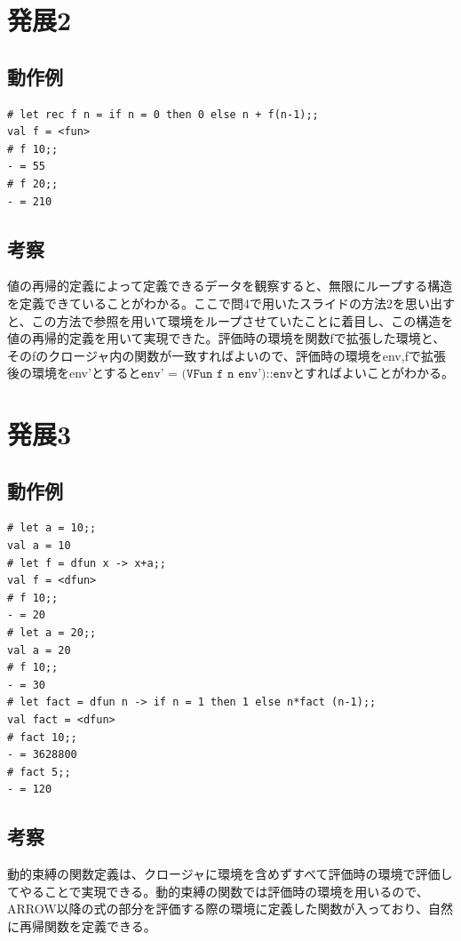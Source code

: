 \documentclass[11pt,a4paper]{jsarticle}
\begin{document}
\section*{発展2}
\subsection*{動作例}
\begin{lstlisting}[basicstyle=\ttfamily\footnotesize, frame=single]
# let rec f n = if n = 0 then 0 else n + f(n-1);;
val f = <fun>
# f 10;;
- = 55
# f 20;;
- = 210
\end{lstlisting}
\subsection*{考察}
値の再帰的定義によって定義できるデータを観察すると、無限にループする構造を定義できていることがわかる。ここで問4で用いたスライドの方法2を思い出すと、この方法で参照を用いて環境をループさせていたことに着目し、この構造を値の再帰的定義を用いて実現できた。評価時の環境を関数fで拡張した環境と、そのfのクロージャ内の関数が一致すればよいので、評価時の環境をenv,fで拡張後の環境をenv'とすると$\texttt{env' = (VFun f n env')::env}$とすればよいことがわかる。
\section*{発展3}
\subsection*{動作例}
\begin{lstlisting}[basicstyle=\ttfamily\footnotesize, frame=single]
# let a = 10;;
val a = 10
# let f = dfun x -> x+a;;
val f = <dfun>
# f 10;;
- = 20
# let a = 20;;
val a = 20
# f 10;;
- = 30
# let fact = dfun n -> if n = 1 then 1 else n*fact (n-1);;
val fact = <dfun>
# fact 10;;
- = 3628800
# fact 5;;
- = 120
\end{lstlisting}
\subsection*{考察}
動的束縛の関数定義は、クロージャに環境を含めずすべて評価時の環境で評価してやることで実現できる。動的束縛の関数では評価時の環境を用いるので、ARROW以降の式の部分を評価する際の環境に定義した関数が入っており、自然に再帰関数を定義できる。
\end{document}
